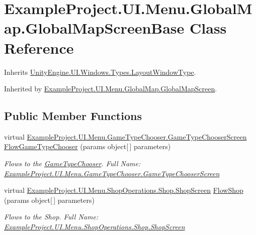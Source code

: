 \hypertarget{class_example_project_1_1_u_i_1_1_menu_1_1_global_map_1_1_global_map_screen_base}{}\section{Example\+Project.\+U\+I.\+Menu.\+Global\+Map.\+Global\+Map\+Screen\+Base Class Reference}
\label{class_example_project_1_1_u_i_1_1_menu_1_1_global_map_1_1_global_map_screen_base}


Inherits \hyperlink{class_unity_engine_1_1_u_i_1_1_windows_1_1_types_1_1_layout_window_type}{Unity\+Engine.\+U\+I.\+Windows.\+Types.\+Layout\+Window\+Type}.



Inherited by \hyperlink{class_example_project_1_1_u_i_1_1_menu_1_1_global_map_1_1_global_map_screen}{Example\+Project.\+U\+I.\+Menu.\+Global\+Map.\+Global\+Map\+Screen}.

\subsection*{Public Member Functions}
\begin{DoxyCompactItemize}
\item 
virtual \hyperlink{class_example_project_1_1_u_i_1_1_menu_1_1_game_type_chooser_1_1_game_type_chooser_screen}{Example\+Project.\+U\+I.\+Menu.\+Game\+Type\+Chooser.\+Game\+Type\+Chooser\+Screen} \hyperlink{class_example_project_1_1_u_i_1_1_menu_1_1_global_map_1_1_global_map_screen_base_aa688be62ab8e03e85e9db346d1a6b91d}{Flow\+Game\+Type\+Chooser} (params object\mbox{[}$\,$\mbox{]} parameters)
\begin{DoxyCompactList}\small\item\em Flows to the \hyperlink{namespace_example_project_1_1_u_i_1_1_menu_1_1_game_type_chooser}{Game\+Type\+Chooser}. Full Name\+: \hyperlink{class_example_project_1_1_u_i_1_1_menu_1_1_game_type_chooser_1_1_game_type_chooser_screen}{Example\+Project.\+U\+I.\+Menu.\+Game\+Type\+Chooser.\+Game\+Type\+Chooser\+Screen} \end{DoxyCompactList}\item 
virtual \hyperlink{class_example_project_1_1_u_i_1_1_menu_1_1_shop_operations_1_1_shop_1_1_shop_screen}{Example\+Project.\+U\+I.\+Menu.\+Shop\+Operations.\+Shop.\+Shop\+Screen} \hyperlink{class_example_project_1_1_u_i_1_1_menu_1_1_global_map_1_1_global_map_screen_base_a081f929e781bed1aae6f56cd42dcb873}{Flow\+Shop} (params object\mbox{[}$\,$\mbox{]} parameters)
\begin{DoxyCompactList}\small\item\em Flows to the Shop. Full Name\+: \hyperlink{class_example_project_1_1_u_i_1_1_menu_1_1_shop_operations_1_1_shop_1_1_shop_screen}{Example\+Project.\+U\+I.\+Menu.\+Shop\+Operations.\+Shop.\+Shop\+Screen} \end{DoxyCompactList}\end{DoxyCompactItemize}
